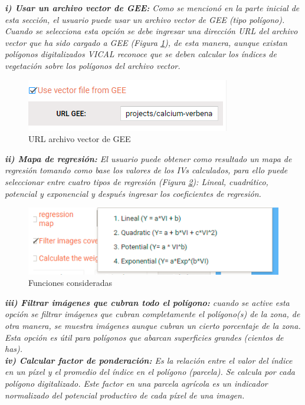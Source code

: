 \documentclass[
]{book}
\begin{document}
\emph{\textbf{i) Usar un archivo vector de GEE:} Como se mencionó en la parte inicial de esta sección, el usuario puede usar un archivo vector de GEE (tipo polígono). Cuando se selecciona esta opción se debe ingresar una dirección URL del archivo vector que ha sido cargado a GEE (Figura \ref{fig:figG7}), de esta manera, aunque existan polígonos digitalizados VICAL reconoce que se deben calcular los índices de vegetación sobre los polígonos del archivo vector. }

\begin{figure}

{\centering \includegraphics{./images/Figure10} 

}

\caption{URL archivo vector de GEE}\label{fig:figG7}
\end{figure}

\emph{\textbf{ii) Mapa de regresión:} El usuario puede obtener como resultado un mapa de regresión tomando como base los valores de los IVs calculados, para ello puede seleccionar entre cuatro tipos de regresión (Figura \ref{fig:figG8}): Lineal, cuadrático, potencial y exponencial y después ingresar los coeficientes de regresión.}

\begin{figure}

{\centering \includegraphics{./images/Figure8} 

}

\caption{Funciones consideradas}\label{fig:figG8}
\end{figure}

\emph{\textbf{iii) Filtrar imágenes que cubran todo el polígono:} cuando se active esta opción se filtrar imágenes que cubran completamente el polígono(s) de la zona, de otra manera, se muestra imágenes aunque cubran un cierto porcentaje de la zona. Esta opción es útil para polígonos que abarcan superficies grandes (cientos de has).}\\
\emph{\textbf{iv) Calcular factor de ponderación:} Es la relación entre el valor del índice en un píxel y el promedio del índice en el polígono (parcela). Se calcula por cada polígono digitalizado. Este factor en una parcela agrícola es un indicador normalizado del potencial productivo de cada píxel de una imagen. }
\end{document}
